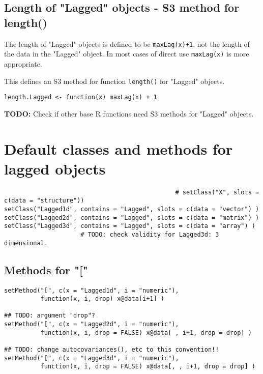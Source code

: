\documentclass[11pt,a4paper]{article}
\begin{document}
\subsection{Length of "Lagged" objects - S3 method for length()}
\label{sec:org003dcb3}

The length of "Lagged" objects is defined to be \texttt{maxLag(x)+1}, not the length of the data in
the "Lagged" object. In most cases of direct use \texttt{maxLag(x)} is more appropriate.

This defines an S3 method for function \texttt{length()} for "Lagged" objects.
\begin{verbatim}
length.Lagged <- function(x) maxLag(x) + 1
\end{verbatim}

\textbf{TODO:} Check if other base R functions need S3 methods for "Lagged" objects.



\section{Default classes and methods for lagged objects}
\label{sec:org532abca}


\begin{verbatim}
                                               # setClass("X", slots = c(data = "structure"))
setClass("Lagged1d", contains = "Lagged", slots = c(data = "vector") )
setClass("Lagged2d", contains = "Lagged", slots = c(data = "matrix") )
setClass("Lagged3d", contains = "Lagged", slots = c(data = "array") )
                     # TODO: check validity for Lagged3d: 3 dimensional.
\end{verbatim}


\subsection{Methods for "["}
\label{sec:org5438680}

\begin{verbatim}
setMethod("[", c(x = "Lagged1d", i = "numeric"),
          function(x, i, drop) x@data[i+1] )

## TODO: argument "drop"?
setMethod("[", c(x = "Lagged2d", i = "numeric"),
          function(x, i, drop = FALSE) x@data[ , i+1, drop = drop] )

## TODO: change autocovariances(), etc to this convention!!
setMethod("[", c(x = "Lagged3d", i = "numeric"),
          function(x, i, drop = FALSE) x@data[, , i+1, drop = drop] )
\end{verbatim}
\end{document}
